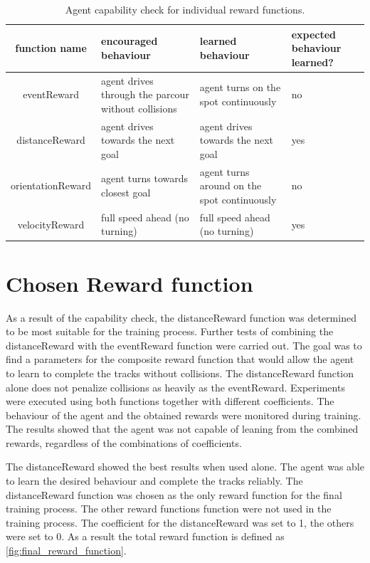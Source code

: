 \begin{table}
\begin{center}
\begin{tabular}{|| c | p{} | p{} | p{} ||} 
    \hline
    function name & encouraged behaviour & learned behaviour  & expected behaviour learned? \\ [0.5ex] 
    \hline\hline
    eventReward &  agent drives through the parcour without collisions & agent turns on the spot continuously & no \\ 
    \hline
    distanceReward & agent drives towards the next goal & agent drives towards the next goal & yes \\
    \hline
    orientationReward & agent turns towards closest goal & agent turns around on the spot continuously & no \\
    \hline
    velocityReward  & full speed ahead (no turning) & full speed ahead (no turning) & yes \\
    \hline
\end{tabular}
\end{center}
\caption{Agent capability check for individual reward functions.}
\label{table:reward_functions_behaviour}
\end{table}


\section{Chosen Reward function}

As a result of the capability check, the distanceReward function was determined to be most suitable for the training process. Further tests of combining the distanceReward with the eventReward function were carried out. The goal was to find a parameters for the composite reward function that would allow the agent to learn to complete the tracks without collisions. The distanceReward function alone does not penalize collisions as heavily as the eventReward. 
Experiments were executed using both functions together with different coefficients. The behaviour of the agent and the obtained rewards were monitored during training. The results showed that the agent was not capable of leaning from the combined rewards, regardless of the combinations of coefficients.

The distanceReward showed the best results when used alone. The agent was able to learn the desired behaviour and complete the tracks reliably. The distanceReward function was chosen as the only reward function for the final training process. The other reward functions function were not used in the training process. 
The coefficient for the distanceReward was set to 1, the others were set to 0. As a result the total reward function is defined as \ref{fig:final_reward_function}. 

